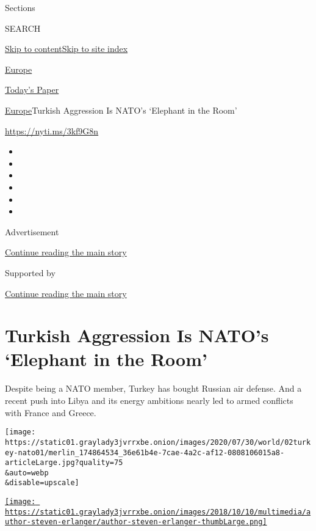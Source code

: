 Sections

SEARCH

\protect\hyperlink{site-content}{Skip to
content}\protect\hyperlink{site-index}{Skip to site index}

\href{https://www.nytimes3xbfgragh.onion/section/world/europe}{Europe}

\href{https://myaccount.nytimes3xbfgragh.onion/auth/login?response_type=cookie\&client_id=vi}{}

\href{https://www.nytimes3xbfgragh.onion/section/todayspaper}{Today's
Paper}

\href{/section/world/europe}{Europe}\textbar{}Turkish Aggression Is
NATO's `Elephant in the Room'

\url{https://nyti.ms/3kf9G8n}

\begin{itemize}
\item
\item
\item
\item
\item
\item
\end{itemize}

Advertisement

\protect\hyperlink{after-top}{Continue reading the main story}

Supported by

\protect\hyperlink{after-sponsor}{Continue reading the main story}

\hypertarget{turkish-aggression-is-natos-elephant-in-the-room}{%
\section{Turkish Aggression Is NATO's `Elephant in the
Room'}\label{turkish-aggression-is-natos-elephant-in-the-room}}

Despite being a NATO member, Turkey has bought Russian air defense. And
a recent push into Libya and its energy ambitions nearly led to armed
conflicts with France and Greece.

\texttt{[image: https://static01.graylady3jvrrxbe.onion/images/2020/07/30/world/02turkey-nato01/merlin\_174864534\_36e61b4e-7cae-4a2c-af12-0808106015a8-articleLarge.jpg?quality=75\\\&auto=webp\\\&disable=upscale]}

\href{https://www.nytimes3xbfgragh.onion/by/steven-erlanger}{\texttt{[image: https://static01.graylady3jvrrxbe.onion/images/2018/10/10/multimedia/author-steven-erlanger/author-steven-erlanger-thumbLarge.png]}}

